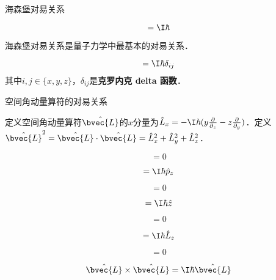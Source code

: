 \begin{theorem}{海森堡对易关系}\label{ComOpQ_the5}

\begin{equation}
[\hat{x}, \hat{p}_x] = \I\hbar
\end{equation}

\end{theorem}



海森堡对易关系是量子力学中最基本的对易关系．



\begin{corollary}{}\label{ComOpQ_cor1}

\begin{equation}
[\hat{i}, \hat{p}_j]=\I\hbar\delta_{ij}
\end{equation}
其中$i, j\in\{x, y, z\}$，$\delta_{ij}$是\textbf{克罗内克 delta 函数}．
\end{corollary}

\begin{theorem}{空间角动量算符的对易关系}\label{ComOpQ_the6}

定义空间角动量算符$\hat{\bvec{L}}$的$x$分量为$\hat{L}_x=-\I\hbar(y\frac{\partial}{\partial_z}-z\frac{\partial}{\partial _y})$．定义$\hat{\bvec{L}}^2=\hat{\bvec{L}}\cdot \hat{\bvec{L}}=\hat{L}_x^2+\hat{L}_y^2+\hat{L}_z^2$．

\begin{equation}
[\hat{p}_x, \hat{L}_x]=0
\end{equation}

\begin{equation}
[\hat{p}_x, \hat{L}_y]=\I\hbar\hat{p}_z
\end{equation}

\begin{equation}
[\hat{x}, \hat{L}_x]=0
\end{equation}

\begin{equation}
[\hat{x}, \hat{L}_y]=\I\hbar\hat{z}
\end{equation}

\begin{equation}
[\hat{L}_x, \hat{L}_x]=0
\end{equation}

\begin{equation}
[\hat{L}_x, \hat{L}_y]=\I\hbar\hat{L}_z
\end{equation}

\begin{equation}
[\hat{\bvec{L}}^2, \hat{L}_x]=0
\end{equation}

\begin{equation}
\hat{\bvec{L}}\times\hat{\bvec{L}}=\I\hbar \hat{\bvec{L}}
\end{equation}

\end{theorem}





